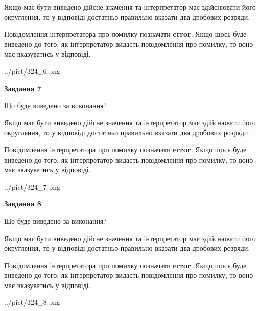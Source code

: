 \documentclass[12pt, ukrainian]{article}
\begin{document}
{\begin {Large}
Якщо має бути виведено дійсне значення та інтерпретатор має здійснювати його округлення, 
то у відповіді достатньо правильно вказати два дробових розряди.

Повідомлення інтерпретатора про помилку позначати \textbf{error}.
Якщо щось буде виведено до того, як інтерпретатор видасть повідомлення про помилку, 
то воно має вказуватись у відповіді. \par

\begin{center}
	{../pict/324_6.png}
\end{center}
\newpage

{\begin {center}\textbf{Завдання 7}\end {center}}\par
Що буде виведено за виконання? \par

Якщо має бути виведено дійсне значення та інтерпретатор має здійснювати його округлення, 
то у відповіді достатньо правильно вказати два дробових розряди.

Повідомлення інтерпретатора про помилку позначати \textbf{error}.
Якщо щось буде виведено до того, як інтерпретатор видасть повідомлення про помилку, 
то воно має вказуватись у відповіді. \par

\begin{center}
	{../pict/324_7.png}
\end{center}
\newpage

{\begin {center}\textbf{Завдання 8}\end {center}}\par
Що буде виведено за виконання? \par

Якщо має бути виведено дійсне значення та інтерпретатор має здійснювати його округлення, 
то у відповіді достатньо правильно вказати два дробових розряди.

Повідомлення інтерпретатора про помилку позначати \textbf{error}.
Якщо щось буде виведено до того, як інтерпретатор видасть повідомлення про помилку, 
то воно має вказуватись у відповіді. \par

\begin{center}
	{../pict/324_8.png}
\end{center}
\newpage


\end{Large}}
\end{document}

